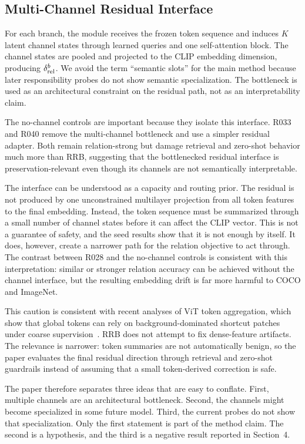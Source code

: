 \subsection{Multi-Channel Residual Interface}

For each branch, the module receives the frozen token sequence and induces $K$ latent channel states through learned queries and one self-attention block. The channel states are pooled and projected to the CLIP embedding dimension, producing $\delta_{\mathrm{rel}}^b$. We avoid the term ``semantic slots'' for the main method because later responsibility probes do not show semantic specialization. The bottleneck is used as an architectural constraint on the residual path, not as an interpretability claim.

The no-channel controls are important because they isolate this interface. R033 and R040 remove the multi-channel bottleneck and use a simpler residual adapter. Both remain relation-strong but damage retrieval and zero-shot behavior much more than RRB, suggesting that the bottlenecked residual interface is preservation-relevant even though its channels are not semantically interpretable.

The interface can be understood as a capacity and routing prior. The residual is not produced by one unconstrained multilayer projection from all token features to the final embedding. Instead, the token sequence must be summarized through a small number of channel states before it can affect the CLIP vector. This is not a guarantee of safety, and the seed results show that it is not enough by itself. It does, however, create a narrower path for the relation objective to act through. The contrast between R028 and the no-channel controls is consistent with this interpretation: similar or stronger relation accuracy can be achieved without the channel interface, but the resulting embedding drift is far more harmful to COCO and ImageNet.

This caution is consistent with recent analyses of ViT token aggregation, which show that global tokens can rely on background-dominated shortcut patches under coarse supervision~\cite{shi2026lastvit}. RRB does not attempt to fix dense-feature artifacts. The relevance is narrower: token summaries are not automatically benign, so the paper evaluates the final residual direction through retrieval and zero-shot guardrails instead of assuming that a small token-derived correction is safe.

The paper therefore separates three ideas that are easy to conflate. First, multiple channels are an architectural bottleneck. Second, the channels might become specialized in some future model. Third, the current probes do not show that specialization. Only the first statement is part of the method claim. The second is a hypothesis, and the third is a negative result reported in Section~4.

